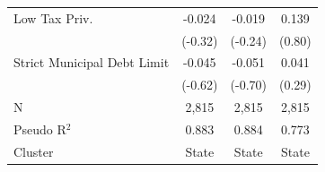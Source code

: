 \begin{tabular*}{\textwidth}{@{\extracolsep{\fill}}lccc}
   Low Tax Priv.               & -0.024            & -0.019                & 0.139\\   
                               & (-0.32)          & (-0.24)              & (0.80)\\   
   Strict Municipal Debt Limit & -0.045            & -0.051                & 0.041\\   
                               & (-0.62)          & (-0.70)              & (0.29)\\   
   \hline
   N                & 2,815             & 2,815                 & 2,815\\  
   Pseudo R$^2$                & 0.883             & 0.884                 & 0.773\\  
   Cluster              & State & State & State\\  
   \bottomrule
\end{tabular*}
\par\endgroup
